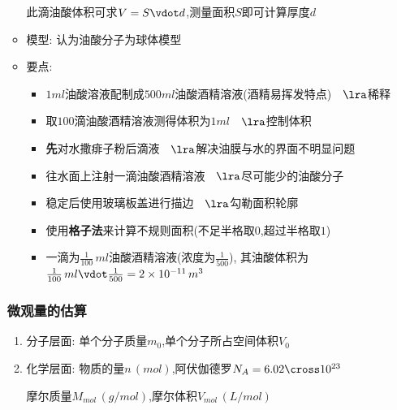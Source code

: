 \documentclass{article}
\begin{document}
\begin{enumerate}
\begin{itemize}
                    \hspace{2.7em}此滴油酸体积可求$V = S \vdot d $,测量面积$S$即可计算厚度$d$
              \item 模型: 认为油酸分子为球体模型
              \item 要点:
                    \begin{itemize}
                        \item $1ml$油酸溶液配制成$500ml$油酸酒精溶液(酒精易挥发特点)$\hspace{1em}\lra$稀释
                        \item 取$100$滴油酸酒精溶液测得体积为$1ml$$\hspace{1em}\lra$控制体积
                        \item \textbf{先}对水撒痱子粉后滴液$\hspace{1em}\lra$解决油膜与水的界面不明显问题
                        \item 往水面上注射一滴油酸酒精溶液$\hspace{1em}\lra$尽可能少的油酸分子
                        \item 稳定后使用玻璃板盖进行描边$\hspace{1em}\lra$勾勒面积轮廓
                        \item 使用\textbf{格子法}来计算不规则面积(不足半格取$0$,超过半格取$1$)
                        \item 一滴为$\frac{1}{100} \, ml$油酸酒精溶液(浓度为$\frac{1}{500}$),
                              其油酸体积为$\frac{1}{100} \, ml \vdot \frac{1}{500} = 2 \times 10 ^{-11} \, m^{3}$
                    \end{itemize}
          \end{itemize}

          \vspace{2em}

          \subsubsection{微观量的估算}
          \begin{enumerate}[label = (\arabic*{})]
              \item 分子层面: 单个分子质量$m_{0}$,单个分子所占空间体积$V_{0}$
              \item 化学层面: 物质的量$n \, (mol)$,阿伏伽德罗$N_{A} = 6.02 \cross 10^{23}$

                    \hspace{4.8em}摩尔质量$M_{mol} \, (g \slash mol)$,摩尔体积$V_{mol} \, (L \slash mol)$


\end{enumerate}
\end{enumerate}
\end{document}
